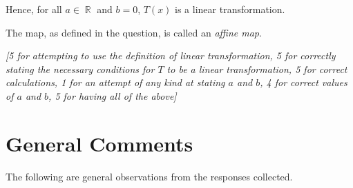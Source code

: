 \documentclass[answers,11pt]{exam}
\theoremstyle{definition}
\DeclareMathOperator{\R}{\mathbb{R}}
\DeclareMathOperator{\1}{\mathbbm{1}}
\begin{document}
\begin{questions}
\begin{solution}
	Hence, for all $a \in \R$ and $b=0$, $T(x)$ is a linear transformation.
	
	The map, as defined in the question, is called an \textit{affine map}.
	
	\textit{[5 for attempting to use the definition of linear transformation, 5 for correctly stating the necessary conditions for $T$ to be a linear transformation, 5 for correct calculations, 1 for an attempt of any kind at stating $a$ and $b$, 4 for correct values of $a$ and $b$, 5 for having all of the above]}
\end{solution}



\end{questions}


\clearpage


\section*{General Comments}


The following are general observations from the responses collected.
\end{document}
